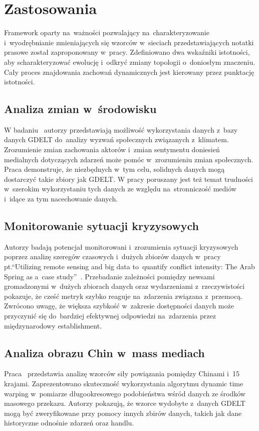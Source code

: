 \documentclass[11pt]{report}
\begin{document}
    \section{Zastosowania}\label{sec:zastosowania}
    Framework oparty na~ważności pozwalający na~charakteryzowanie
    i~wyodrębnianie zmieniających się wzorców w~sieciach przedstawiających notatki prasowe został zaproponowany
    w~pracy\cite{Yan2012}.
    Zdefiniowano dwa wskaźniki istotności, aby scharakteryzować ewolucję i~odkryć zmiany topologii o~doniosłym znaczeniu.
    Cały proces znajdowania zachowań dynamicznych jest kierowany przez punktację istotności.

    \subsection{Analiza zmian w~środowisku}
    W badaniu~\cite{Buckingham2020} autorzy przedstawiają możliwość wykorzystania danych z~bazy danych GDELT
    do~analizy wyzwań społecznych związanych z~klimatem.
    Zrozumienie zmian zachowania aktorów i~zmian sentymentu doniesień medialnych dotyczących zdarzeń może pomóc w~zrozumieniu zmian społecznych.
    Praca demonstruje, że niezbędnych w~tym celu, solidnych danych mogą dostarczyć takie zbiory jak GDELT\@.
    W pracy poruszany jest też temat trudności w~szerokim wykorzystaniu tych danych ze względu na~stronniczość mediów
    i~idące za tym nacechowanie danych.

    \subsection{Monitorowanie sytuacji kryzysowych}
    Autorzy badają potencjał monitorowani i~zrozumienia sytuacji kryzysowych poprzez analizę szeregów czasowych i~dużych zbiorów danych
    w~pracy pt.\@ ``Utilizing remote sensing and big data to~quantify conflict intensity: The Arab Spring as a~case study''~\cite{Levin2018}.
    Przebadanie zależności pomiędzy newsami gromadzonymi w~dużych zbiorach danych oraz wydarzeniami z~rzeczywistości pokazuje,
    że cześć metryk szybko reaguje na~zdarzenia związana z~przemocą.
    Zwrócono uwagę, że większa szybkość w~zakresie dostępności danych może przyczynić się do~bardziej efektywnej
    odpowiedzi na~zdarzenia przez międzynarodowy establishment.

    \subsection{Analiza obrazu Chin w~mass mediach}
    Praca~\cite{Yuan2017} przedstawia analizę wzorców siły powiązania pomiędzy Chinami i~15 krajami.
    Zaprezentowano skuteczność wykorzystania algorytmu dynamic time warping w~pomiarze długookresowego podobieństwa
    wśród danych ze środków masowego przekazu.
    Autorzy pokazują, że wzorce wydobyte z~danych GDELT mogą być zweryfikowane przy pomocy innych zbirów danych,
    takich jak dane historyczne odnośnie zdarzeń oraz handlu.
\end{document}
